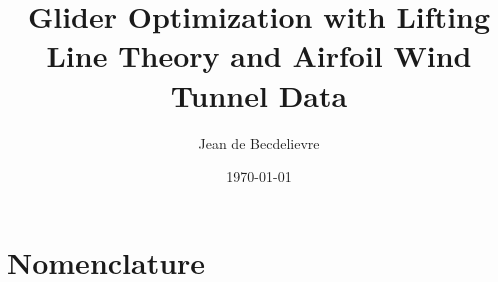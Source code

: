 \documentclass[letterpaper,12pt]{article}
\begin{document}
\newcommand{\cldat}{\boldsymbol{{c_l}^{2D}}}
\newcommand{\CDp}{C_{D_p}}
\newcommand{\CDi}{C_{D_i}}
\newcommand{\cl}[1]{{c_l}_{\bf #1}}
\newcommand{\cdp}[1]{{c_{d_p}}_{\bf #1}}
\newcommand{\cb}[1]{\left(
	\frac c b 
\right)_{#1}
}
\newcommand{\cddat}{\boldsymbol{{c_{d_p}}^{2D}}}


\title{Glider Optimization with Lifting Line Theory and Airfoil Wind Tunnel Data}
\author{Jean de Becdelievre}
\date{\today}
\maketitle

\section{Nomenclature}
\end{document}
